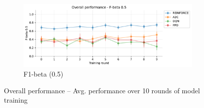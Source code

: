 \documentclass[a4paper, 12pt]{article}
\begin{document}
\begin{figure}[ht]
	\begin{subfigure}{\textwidth}
		\centering
		\includegraphics[width=\linewidth]{Overall_F05.pdf}  
		\caption{F1-beta (0.5)}
		\label{fig:tr-ovr-f05}
	\end{subfigure}
	\caption{Overall performance -- Avg. performance over 10 rounds of model training}
	\label{fig:tr-overall}
\end{figure}
\end{document}

